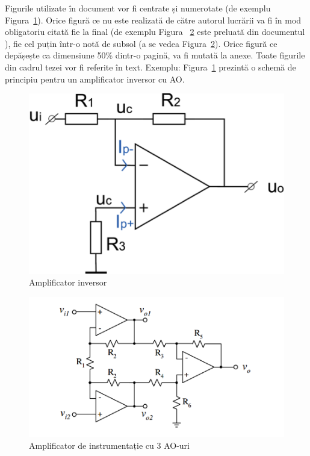 \documentclass[12pt,a4paper]{report}
\begin{document}
Figurile utilizate în document vor fi centrate și numerotate (de exemplu Figura~\ref{fig:pic1}). 
Orice figură ce nu este realizată de către autorul lucrării va fi în mod obligatoriu citată fie la final (de exemplu Figura ~\ref{fig:pic2} este preluată din documentul \cite{}), fie cel puțin într-o notă de subsol (a se vedea Figura~\ref{fig:pic2}). Orice figură ce depășește ca dimensiune 50\% dintr-o pagină, va fi mutată la anexe. Toate figurile din cadrul tezei vor fi referite în text. Exemplu: Figura~\ref{fig:pic1} prezintă o schemă de principiu pentru un amplificator inversor cu AO. 

\begin{figure}[th]
\centering
\includegraphics{pics/Pic1.png}
  \caption{Amplificator inversor}
  \label{fig:pic1}
\end{figure}

\newpage

\begin{figure}[th]
\centering
\includegraphics{pics/Pic2.png}
  \caption[Amplificator de instrumentație cu 3 AO-uri]{Amplificator de instrumentație cu 3 AO-uri\protect\footnotemark}
  \label{fig:pic2}
\end{figure}
\end{document}
